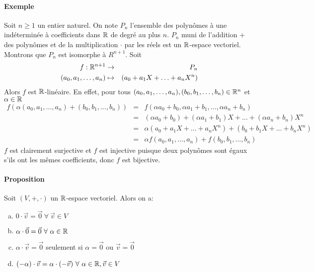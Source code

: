 \paragraph{Exemple} Soit $n \geq 1$ un entier naturel. On note $P_n$ l'ensemble des polynômes à une indéterminée à coefficients dans $\mathbb{R}$ de degré au plus $n$. $P_n$ muni de l'addition $+$ des polynômes et de la multiplication $\cdot$ par les réels est un $\mathbb{R}$-espace vectoriel. Montrons que $P_n$ est isomorphe à $R^{n+1}$. Soit
\begin{eqnarray*}
  f: \mathbb{R}^{n+1} &\rightarrow& P_n \\
  (a_0, a_1, \ldots, a_n) &\mapsto& (a_0 + a_1 X + \ldots + a_n X^n)
\end{eqnarray*}
Alors $f$ est $\mathbb{R}$-linéaire. En effet, pour tous $(a_0, a_1, \ldots, a_n),  (b_0, b_1, \ldots, b_n) \in \mathbb{R}^n$ et $\alpha\in\mathbb{R}$
\begin{eqnarray*}
  f(\alpha (a_0, a_1, \ldots, a_n) + (b_0, b_1, \ldots, b_n)) &=& f(\alpha a_0 + b_0, \alpha a_1 + b_1, \ldots, \alpha a_n + b_n) \\
  &=& (\alpha a_0 + b_0)+ (\alpha a_1 + b_1) X + \ldots + (\alpha a_n + b_n) X^n \\
  &=& \alpha (a_0 + a_1 X + \ldots + a_n X^n) + (b_0 + b_1 X + \ldots + b_n X^n) \\
  &=& \alpha f(a_0, a_1, \ldots, a_n) + f(b_0, b_1, \ldots, b_n)
\end{eqnarray*}
$f$ est clairement surjective et $f$ est injective puisque deux polynômes sont égaux s'ils ont les mêmes coefficients, donc $f$ est bijective.

\paragraph{Proposition} Soit $(V, +, \cdot)$ un $\mathbb{R}$-espace vectoriel. Alors on a:
\begin{enumerate}[a)]
  \item $0\cdot \vec{v} = \vec{0} ~\forall~ \vec{v} \in V$
  \item $\alpha \cdot \vec{0} = \vec{0} ~\forall~ \alpha \in \mathbb{R}$
  \item $\alpha \cdot \vec{v} = \vec{0}$ seulement si $\alpha = \vec{0}$ ou $\vec{v} = \vec{0}$
  \item $(-\alpha)\cdot \vec{v} = \alpha \cdot (-\vec{v}) ~\forall~ \alpha \in \mathbb{R}, \vec{v} \in V$
\end{enumerate}

